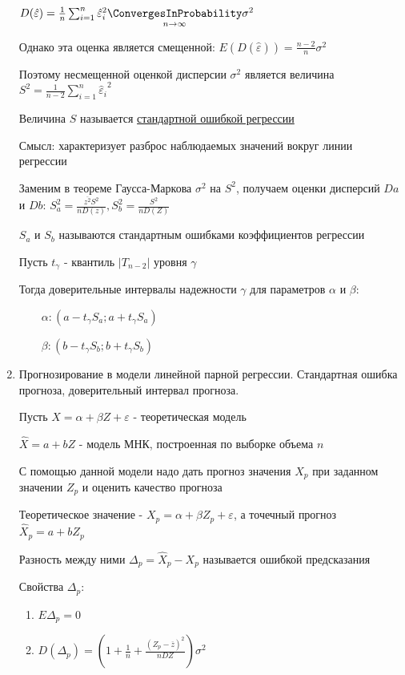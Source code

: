\documentclass[12pt]{article}
\begin{document}
\begin{enumerate}
    $D(\hat \varepsilon) = \frac{1}{n} \sum_{i = 1}^n {\hat \varepsilon_i}^2 \underset{n \to \infty}{\ConvergesInProbability} \sigma^2$

    Однако эта оценка является смещенной: $E(D(\hat \varepsilon)) = \frac{n - 2}{n} \sigma^2$

    Поэтому несмещенной оценкой дисперсии $\sigma^2$ является величина $S^2 = \frac{1}{n - 2} \sum_{i = 1}^n {\hat \varepsilon_i}^2$

    \Def Величина $S$ называется \hyperlink{regression_coefficient_error}{стандартной ошибкой регрессии}

    Смысл: характеризует разброс наблюдаемых значений вокруг линии регрессии

    \Notas Заменим в теореме Гаусса-Маркова $\sigma^2$ на $S^2$, получаем оценки дисперсий $Da$ и $Db$: $S_a^2 = \frac{\overline{z^2} S^2}{n D(z)}, S^2_b = \frac{S^2}{n D(Z)}$

    \Defs $S_a$ и $S_b$ называются стандартным ошибками коэффициентов регрессии

    Пусть $t_\gamma$ - квантиль $|T_{n - 2}|$ уровня $\gamma$

    Тогда доверительные интервалы надежности $\gamma$ для параметров $\alpha$ и $\beta$:

    $\qquad \alpha: (a - t_\gamma S_a; a + t_\gamma S_a)$

    $\qquad \beta: (b - t_\gamma S_b; b + t_\gamma S_b)$

    \item Прогнозирование в модели линейной парной регрессии. Стандартная ошибка прогноза, доверительный интервал прогноза.

    Пусть $X = \alpha + \beta Z + \varepsilon$ - теоретическая модель

    $\hat X = a + b Z$ - модель МНК, построенная по выборке объема $n$

    С помощью данной модели надо дать прогноз значения $X_p$ при заданном значении $Z_p$ и оценить качество прогноза 

    Теоретическое значение - $X_p = \alpha + \beta Z_p + \varepsilon$, а точечный прогноз $\hat X_p = a + b Z_p$

    Разность между ними $\Delta_p = \hat X_p - X_p$ называется ошибкой предсказания

    Свойства $\Delta_p$:

    \begin{enumerate}
        \item $E \Delta_p = 0$
        \item $D (\Delta_p) = \left(1 + \frac{1}{n} + \frac{(Z_p - \overline{z})^2}{n DZ}\right) \sigma^2$


\end{enumerate}
\end{enumerate}
\end{document}
